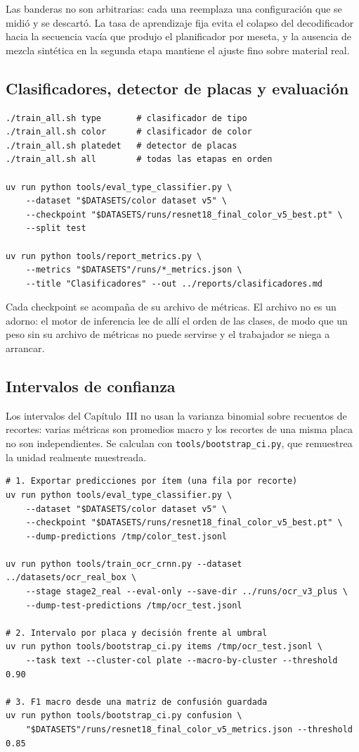 Las banderas no son arbitrarias: cada una reemplaza una configuración que se midió
y se descartó. La tasa de aprendizaje fija evita el colapso del decodificador hacia
la secuencia vacía que produjo el planificador por meseta, y la ausencia de mezcla
sintética en la segunda etapa mantiene el ajuste fino sobre material real.

\subsection{Clasificadores, detector de placas y evaluación}

\begin{verbatim}
./train_all.sh type       # clasificador de tipo
./train_all.sh color      # clasificador de color
./train_all.sh platedet   # detector de placas
./train_all.sh all        # todas las etapas en orden

uv run python tools/eval_type_classifier.py \
    --dataset "$DATASETS/color dataset v5" \
    --checkpoint "$DATASETS/runs/resnet18_final_color_v5_best.pt" \
    --split test

uv run python tools/report_metrics.py \
    --metrics "$DATASETS"/runs/*_metrics.json \
    --title "Clasificadores" --out ../reports/clasificadores.md
\end{verbatim}

Cada checkpoint se acompaña de su archivo de métricas. El archivo no es un adorno:
el motor de inferencia lee de allí el orden de las clases, de modo que un peso sin
su archivo de métricas no puede servirse y el trabajador se niega a arrancar.

\subsection{Intervalos de confianza}
\label{subsec:repro_ci}

Los intervalos del Capítulo~III no usan la varianza binomial sobre recuentos de
recortes: varias métricas son promedios macro y los recortes de una misma placa no
son independientes. Se calculan con \texttt{tools/bootstrap\_ci.py}, que remuestrea
la unidad realmente muestreada.

\begin{verbatim}
# 1. Exportar predicciones por ítem (una fila por recorte)
uv run python tools/eval_type_classifier.py \
    --dataset "$DATASETS/color dataset v5" \
    --checkpoint "$DATASETS/runs/resnet18_final_color_v5_best.pt" \
    --dump-predictions /tmp/color_test.jsonl

uv run python tools/train_ocr_crnn.py --dataset ../datasets/ocr_real_box \
    --stage stage2_real --eval-only --save-dir ../runs/ocr_v3_plus \
    --dump-test-predictions /tmp/ocr_test.jsonl

# 2. Intervalo por placa y decisión frente al umbral
uv run python tools/bootstrap_ci.py items /tmp/ocr_test.jsonl \
    --task text --cluster-col plate --macro-by-cluster --threshold 0.90

# 3. F1 macro desde una matriz de confusión guardada
uv run python tools/bootstrap_ci.py confusion \
    "$DATASETS"/runs/resnet18_final_color_v5_metrics.json --threshold 0.85
\end{verbatim}

